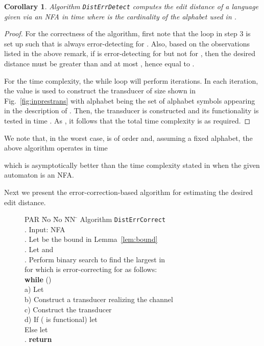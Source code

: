 \documentclass{article}
\theoremstyle{plain}
\newtheorem{corollary}[theorem]{Corollary}
\theoremstyle{definition}
\theoremstyle{remark}
\newcommand\pnsi{\par\indent}
\begin{document}
\begin{corollary}\label{th:ed}
Algorithm \texttt{DistErrDetect} computes the
edit distance of a language given via an NFA  in time 
where  is the cardinality of the alphabet used in .
\end{corollary}
\begin{proof}
For the correctness of the algorithm, first note that the loop in step 3 is set up such that 
is always error-detecting for . Also, based on the observations listed in the above remark, if  is error-detecting for  but not for
, then the desired distance
must be greater than  and at most , hence equal
to .
\pnsi
For the time complexity, the while loop will
perform  iterations. In each
iteration, the value  is
used to construct the transducer of
size  shown in Fig.~\ref{fig:inprestrans} with alphabet
being the set of alphabet symbols appearing
in the description of . Then, the transducer
 is constructed and its functionality
is tested in time .
As , it follows that the total time complexity is
as required.
\end{proof}

We note that, in the worst case,  is
of order  and, assuming a fixed alphabet, the above algorithm operates in time

which  is asymptotically better
than the time complexity stated in \cite{Kon:2007} when the
given automaton is an NFA.

\pssi
Next we present
the error-correction-based algorithm for estimating
the desired edit distance.

\begin{figure}[ht]
\begin{tabbing}
PAR \= No \= No \= NN \= \kill
\> Algorithm \texttt{DistErrCorrect} \\
.\> Input: NFA  \hspace{4mm} \\
.\> Let  be the bound in Lemma~\ref{lem:bound}\\
.\> Let  and \\
.\> Perform binary search to find  the largest  in
       \\
\>  \> for which  is error-correcting for  as follows: \\
\>  \>  \textbf{while} ()\\
\>  \>  a)\> Let \\
\>   \> b)\> Construct a transducer  realizing the channel \\
\>   \> c)\> Construct the transducer \\
\>   \> d)\> If ( is functional)  let \\
\>   \> \>  Else  let \\
. \>  \textbf{return} 
\end{tabbing}
\end{figure}
\end{document}
